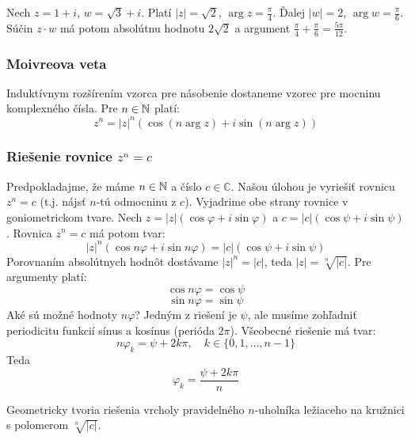 \begin{priklad}
Nech $z = 1+i$, $w = \sqrt{3}+i$.
Platí $|z| = \sqrt{2}$, $\arg z = \frac{\pi}{4}$.
Ďalej $|w| = 2$, $\arg w = \frac{\pi}{6}$.
Súčin $z \cdot w$ má potom absolútnu hodnotu $2\sqrt{2}$ a argument $\frac{\pi}{4} + \frac{\pi}{6} = \frac{5\pi}{12}$.
\end{priklad}


\subsubsection{Moivreova veta}
Induktívnym rozšírením vzorca pre násobenie dostaneme vzorec pre mocninu komplexného čísla. Pre $n \in \mathbb{N}$ platí:
\[ z^n = |z|^n (\cos(n \arg z) + i \sin(n \arg z)) \]

\subsubsection{Riešenie rovnice $z^n = c$}
Predpokladajme, že máme $n \in \mathbb{N}$ a číslo $c \in \mathbb{C}$. Našou úlohou je vyriešiť rovnicu $z^n = c$ (t.j. nájsť $n$-tú odmocninu z $c$).
Vyjadrime obe strany rovnice v goniometrickom tvare. Nech $z = |z|(\cos \varphi + i \sin \varphi)$ a $c = |c|(\cos \psi + i \sin \psi)$.
Rovnica $z^n = c$ má potom tvar:
\[ |z|^n (\cos n\varphi + i \sin n\varphi) = |c|(\cos \psi + i \sin \psi) \]
Porovnaním absolútnych hodnôt dostávame $|z|^n = |c|$, teda $|z| = \sqrt[n]{|c|}$.
Pre argumenty platí:
\[ \cos n\varphi = \cos \psi \]
\[ \sin n\varphi = \sin \psi \]
Aké sú možné hodnoty $n\varphi$?
Jedným z riešení je $\psi$, ale musíme zohľadniť periodicitu funkcií sínus a kosínus (perióda $2\pi$). Všeobecné riešenie má tvar:
\[ n\varphi_k = \psi + 2k\pi, \quad k \in \{0, 1, \dots, n-1\} \]
Teda
\[ \varphi_k = \frac{\psi + 2k\pi}{n} \]

Geometricky tvoria riešenia vrcholy pravidelného $n$-uholníka ležiaceho na kružnici s polomerom $\sqrt[n]{|c|}$.

